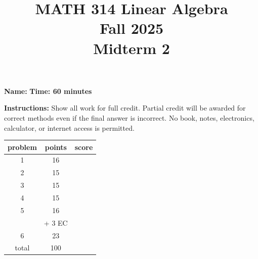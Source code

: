 \documentclass[11pt]{amsart}
\title{MATH 314 Linear Algebra\\ Fall 2025\\ Midterm 2}
\author{}
\date{}
\begin{document}
\maketitle

\noindent\textbf{Name:} \underline{\hspace{3in}} \hfill \textbf{Time: 60 minutes}

\vspace{0.2in}

\noindent\textbf{Instructions:} Show all work for full credit. Partial credit will be awarded for correct methods even if the final answer is incorrect. No book, notes, electronics, calculator, or internet access is permitted.
\vfill

\begin{center}
{\Large{
\begin{tabular}{ccc}
problem&points&score\\
\hline
1&16&\\ \hline
2&15&\\ \hline
3&15&\\ \hline
4&15&\\ \hline
5&16 & \\ \hline
&+ 3 EC&\\ \hline
6&23&\\ \hline

\hline 
total&100&\\
\end{tabular}
}}
\end{center}
\vfill
\vfill
\newpage
\end{document}
